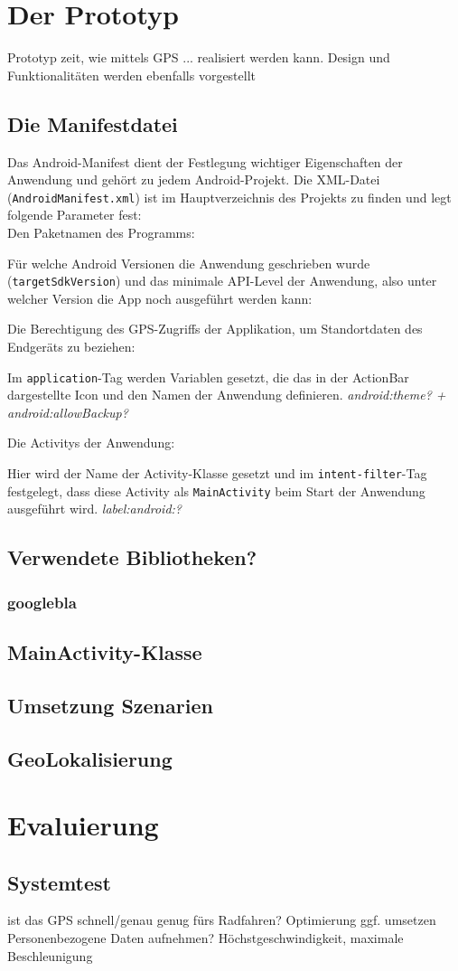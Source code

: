 \chapter{\label{chap:implementierung}Der Prototyp}
Prototyp zeit, wie mittels GPS ... realisiert werden kann.
Design und Funktionalitäten werden ebenfalls vorgestellt
\section{Die Manifestdatei}
Das Android-Manifest dient der Festlegung wichtiger Eigenschaften der Anwendung und gehört zu jedem Android-Projekt. Die \gls{XML}-Datei (\texttt{AndroidManifest.xml}) ist im Hauptverzeichnis des Projekts zu finden und legt folgende Parameter fest: \\
Den Paketnamen des Programms:

Für welche Android Versionen die Anwendung geschrieben wurde (\texttt{targetSdkVersion}) und das minimale \gls{API}-Level der Anwendung, also unter welcher Version die App noch ausgeführt werden kann:

Die Berechtigung des \gls{GPS}-Zugriffs der Applikation, um Standortdaten des Endgeräts zu beziehen:

Im \texttt{application}-Tag werden Variablen gesetzt, die das in der ActionBar dargestellte Icon und den Namen der Anwendung definieren. \textit{android:theme? + android:allowBackup?}

Die \glspl{Activity} der Anwendung:

Hier wird der Name der \gls{Activity}-Klasse gesetzt und im \texttt{intent-filter}-Tag festgelegt, dass diese \gls{Activity} als \texttt{MainActivity} beim Start der Anwendung ausgeführt wird. \textit{label:android:?}
\section{Verwendete Bibliotheken?}
\subsection{googlebla}
\section{MainActivity-Klasse}
\section{Umsetzung Szenarien}
\section{GeoLokalisierung}
%
%
\chapter{Evaluierung}
\section{Systemtest}
ist das GPS schnell/genau genug fürs Radfahren?
Optimierung ggf. umsetzen\\
Personenbezogene Daten aufnehmen? Höchstgeschwindigkeit, maximale Beschleunigung
